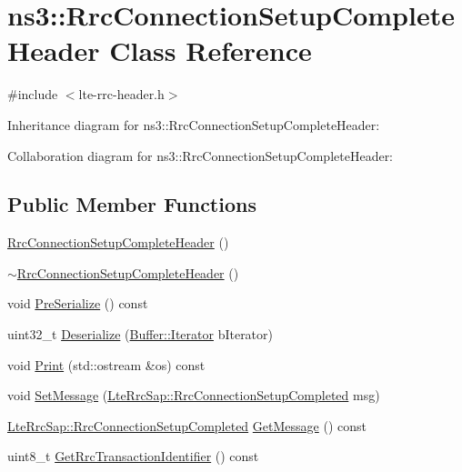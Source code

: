 \hypertarget{classns3_1_1RrcConnectionSetupCompleteHeader}{}\section{ns3\+:\+:Rrc\+Connection\+Setup\+Complete\+Header Class Reference}
\label{classns3_1_1RrcConnectionSetupCompleteHeader}


{\ttfamily \#include $<$lte-\/rrc-\/header.\+h$>$}



Inheritance diagram for ns3\+:\+:Rrc\+Connection\+Setup\+Complete\+Header\+:


Collaboration diagram for ns3\+:\+:Rrc\+Connection\+Setup\+Complete\+Header\+:
\subsection*{Public Member Functions}
\begin{DoxyCompactItemize}
\item 
\hyperlink{classns3_1_1RrcConnectionSetupCompleteHeader_aef69f4f0aca9c869dc137ba18f4cf51e}{Rrc\+Connection\+Setup\+Complete\+Header} ()
\item 
\hyperlink{classns3_1_1RrcConnectionSetupCompleteHeader_a3b11cb57bef3ce66c769fde56515684d}{$\sim$\+Rrc\+Connection\+Setup\+Complete\+Header} ()
\item 
void \hyperlink{classns3_1_1RrcConnectionSetupCompleteHeader_a07502ba5d876f33e0e571776e6b7b1ae}{Pre\+Serialize} () const 
\item 
uint32\+\_\+t \hyperlink{classns3_1_1RrcConnectionSetupCompleteHeader_a6af94bc42c6b6de53b39cb78ddd459a8}{Deserialize} (\hyperlink{classns3_1_1Buffer_1_1Iterator}{Buffer\+::\+Iterator} b\+Iterator)
\item 
void \hyperlink{classns3_1_1RrcConnectionSetupCompleteHeader_ac8f113a517f7ebc376cc55e8a27a6172}{Print} (std\+::ostream \&os) const 
\item 
void \hyperlink{classns3_1_1RrcConnectionSetupCompleteHeader_acd1592d5ffcda03172c6d367e3097c38}{Set\+Message} (\hyperlink{structns3_1_1LteRrcSap_1_1RrcConnectionSetupCompleted}{Lte\+Rrc\+Sap\+::\+Rrc\+Connection\+Setup\+Completed} msg)
\item 
\hyperlink{structns3_1_1LteRrcSap_1_1RrcConnectionSetupCompleted}{Lte\+Rrc\+Sap\+::\+Rrc\+Connection\+Setup\+Completed} \hyperlink{classns3_1_1RrcConnectionSetupCompleteHeader_ad3b445ac069a1189af90c096eb345aa5}{Get\+Message} () const 
\item 
uint8\+\_\+t \hyperlink{classns3_1_1RrcConnectionSetupCompleteHeader_ae2361a21102b8c7c5c7135c8592a521d}{Get\+Rrc\+Transaction\+Identifier} () const 
\end{DoxyCompactItemize}
